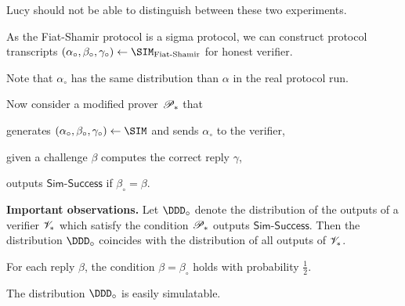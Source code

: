 \documentclass[landscape,footrule]{foils}
\begin{document}


Lucy should not be able to distinguish between these two experiments.




\begin{triangles}
\item As the Fiat-Shamir protocol is a sigma protocol, we can
  construct protocol transcripts
  $(\alpha_\circ,\beta_\circ,\gamma_\circ)\gets\SIM_{\text{Fiat\text{-}Shamir}}$ for honest
  verifier.
\item Note that $\alpha_\circ$ has the same distribution than
  $\alpha$ in the real protocol run.
\item Now consider a modified prover $\mathscr{P}_*$ that
  \begin{diamonds}
    \item  generates $(\alpha_\circ,\beta_\circ,\gamma_\circ)\gets\SIM$ and sends $\alpha_\circ$ to the verifier,
    \item  given a challenge $\beta$ computes the correct reply $\gamma$,
    \item  outputs $\mathsf{Sim\text{-}Success}$ if $\beta_\circ=\beta$. 
  \end{diamonds}
\end{triangles}
\Bigskip

\textbf{Important observations.}  Let $\DDD_\circ$ denote the distribution
of the outputs of a verifier $\mathscr{V}_*$ which satisfy the condition
$\mathscr{P}_*$ outputs $\mathsf{Sim\text{-}Success}$. Then the
distribution $\DDD_\circ$ coincides with the distribution of all 
outputs of $\mathscr{V}_*$.
\begin{triangles}
  \item For each reply $\beta$, the condition $\beta=\beta_\circ$ holds with probability $\frac{1}{2}$.
  \item The distribution $\DDD_\circ$ is easily simulatable.
\end{triangles}


\vspace*{-2cm}
\end{document}
